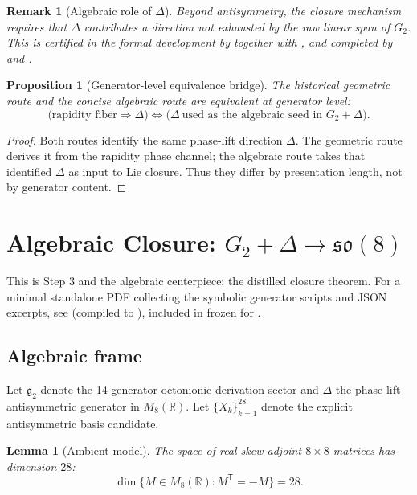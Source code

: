 \documentclass[11pt]{amsart}
\newcommand{\PaperArtifactBundleZip}{\ReleaseDistArchive}
\newtheorem{lemma}[theorem]{Lemma}
\newtheorem{proposition}[theorem]{Proposition}
\newtheorem{remark}[theorem]{Remark}
\begin{document}
\begin{remark}[Algebraic role of \(\Delta\)]
Beyond antisymmetry, the closure mechanism requires that \(\Delta\) contributes a direction not exhausted by the raw linear span of \(G_2\). This is certified in the formal development by  together with , and completed by  and .
\end{remark}

\begin{proposition}[Generator-level equivalence bridge]
The historical geometric route and the concise algebraic route are equivalent at generator level:
\[
\bigl(\text{rapidity fiber}\Rightarrow \Delta\bigr)
\Longleftrightarrow
\bigl(\Delta\ \text{used as the algebraic seed in }G_2+\Delta\bigr).
\]
\end{proposition}

\begin{proof}
Both routes identify the same phase-lift direction \(\Delta\). The geometric route derives it from the rapidity phase channel; the algebraic route takes that identified \(\Delta\) as input to Lie closure. Thus they differ by presentation length, not by generator content.
\end{proof}

\section{Algebraic Closure: \texorpdfstring{$G_2+\Delta\to\mathfrak{so}(8)$}{G2 + Delta to so(8)}}
\label{sec:closure}
This is Step 3 and the algebraic centerpiece: the distilled closure theorem. For a minimal standalone PDF collecting the symbolic generator scripts and JSON excerpts, see  (compiled to ), included in \PaperArtifactBundleZip{} frozen for .

\subsection{Algebraic frame}
Let $\mathfrak g_2$ denote the 14-generator octonionic derivation sector and $\Delta$ the phase-lift antisymmetric generator in $M_8(\mathbb R)$.
Let $\{X_k\}_{k=1}^{28}$ denote the explicit antisymmetric basis candidate.

\begin{lemma}[Ambient model]
The space of real skew-adjoint $8\times8$ matrices has dimension $28$:
\[
\dim\{M\in M_8(\mathbb R):M^{\mathsf T}=-M\}=28.
\]
\end{lemma}
\end{document}
